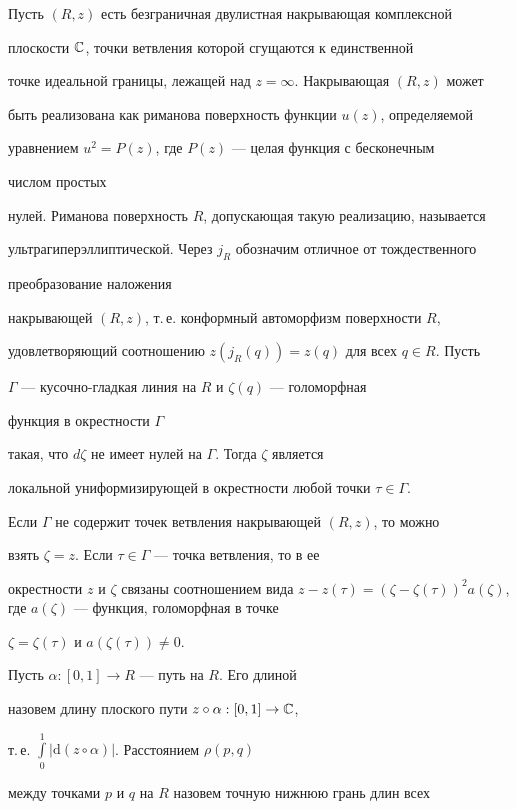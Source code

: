 Пусть $(R,z)$ есть безграничная двулистная накрывающая комплексной


плоскости $\Bbb C$, точки ветвления которой сгущаются к единственной


точке идеальной границы, лежащей над $z=\infty$. Накрывающая $(R,z)$ может


быть реализована как риманова поверхность функции $u(z)$, определяемой


уравнением $u^2=P(z)$, где $P(z)$ --- целая функция с бесконечным


числом простых


нулей. Риманова поверхность $R$, допускающая такую реализацию, называется


ультрагиперэллиптической. Через $j_R$ обозначим отличное от тождественного


преобразование наложения


накрывающей $(R,z)$, т.\,е. конформный автоморфизм поверхности $R$,


удовлетворяющий соотношению $z(j_R(q))=z(q)$ для всех $q\in R$. Пусть


$\Gamma$ --- кусочно-гладкая линия на $R$ и $\zeta (q)$ --- голоморфная


функция в окрестности $\Gamma$


такая, что $d\zeta$ не имеет нулей на $\Gamma$. Тогда $\zeta$ является


локальной униформизирующей в окрестности любой точки $\tau \in \Gamma$.


Если $\Gamma$ не содержит точек ветвления накрывающей $(R,z)$, то можно


взять $\zeta=z$. Если $\tau\in\Gamma$ --- точка ветвления, то в ее


окрестности $z$ и $\zeta$ связаны соотношением вида $z-z(\tau)=(\zeta


-\zeta(\tau))^2a(\zeta)$, где $a(\zeta)$ --- функция, голоморфная в точке


$\zeta =\zeta (\tau)$ и $a(\zeta (\tau))\ne 0$.





Пусть $\alpha:[0, 1] \to R $ --- путь на $R$. Его длиной


назовем длину плоского пути $z\circ\alpha:[0,1]\to\Bbb C$,


т.\,е. $\int\limits_0^1|\mathrm{d}(z\circ\alpha)|$. Расстоянием $\rho(p,q)$


между точками $p$ и $q$ на $R$ назовем точную нижнюю грань длин всех


